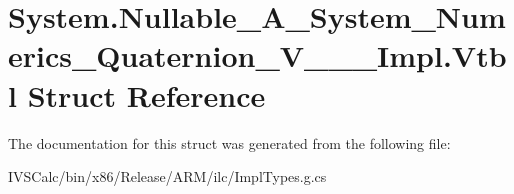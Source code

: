 \hypertarget{struct_system_1_1_nullable___a___system___numerics___quaternion___v_______impl_1_1_vtbl}{}\section{System.\+Nullable\+\_\+\+A\+\_\+\+System\+\_\+\+Numerics\+\_\+\+Quaternion\+\_\+\+V\+\_\+\+\_\+\+\_\+\+Impl.\+Vtbl Struct Reference}
\label{struct_system_1_1_nullable___a___system___numerics___quaternion___v_______impl_1_1_vtbl}


The documentation for this struct was generated from the following file\+:\begin{DoxyCompactItemize}
\item 
I\+V\+S\+Calc/bin/x86/\+Release/\+A\+R\+M/ilc/Impl\+Types.\+g.\+cs\end{DoxyCompactItemize}
